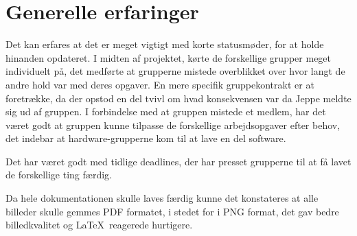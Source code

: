 \section{Generelle erfaringer}

Det kan erfares at det er meget vigtigt med korte statusmøder, for at holde hinanden opdateret. I midten af projektet, kørte de forskellige grupper meget individuelt på, det medførte at grupperne mistede overblikket over hvor langt de andre hold var med deres opgaver. En mere specifik gruppekontrakt er at foretrække, da der opstod en del tvivl om hvad konsekvensen var da Jeppe meldte sig ud af gruppen. I forbindelse med at gruppen mistede et medlem, har det været godt at gruppen kunne tilpasse de forskellige arbejdsopgaver efter behov, det indebar at hardware-grupperne kom til at lave en del software. 

Det har været godt med tidlige deadlines, der har presset grupperne til at få lavet de forskellige ting færdig.

Da hele dokumentationen skulle laves færdig  kunne det konstateres at alle billeder skulle gemmes PDF formatet, i stedet for i PNG format, det gav bedre billedkvalitet og \LaTeX\ reagerede hurtigere.




